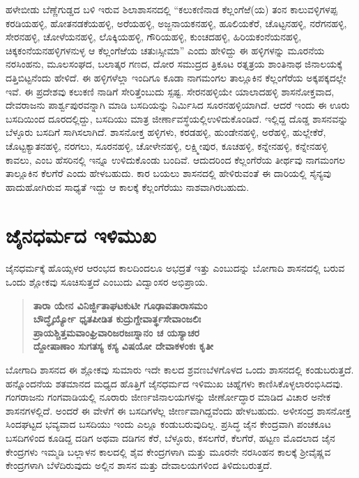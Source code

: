 ಹಳೇಬೀಡು ಬೆಣ್ಣೆಗುಡ್ಡದ ಬಳಿ ಇರುವ ಶಿಲಾಶಾಸನದಲ್ಲಿ “ಕಲುಕಣಿನಾಡ ಕೆಲ್ಲಂಗೆಱೆ(ಯ) ತಂನ ಕಾಲುವಳ್ಳಿ\-ಗಳಪ್ಪ ಕರಡಿಯಹಳ್ಳಿ, ಹೋತನಡಕೆಯಹಳ್ಳಿ, ಅರೆಯಹಳ್ಳಿ, ಅಜ್ಜನಾಯಕನಹಳ್ಳಿ, ಹೂಲಿಯಕೆರೆ, ಚೊಟ್ಟನಹಳ್ಳಿ, ನರೆಗನಹಳ್ಳಿ, ಸೇರನಹಳ್ಳಿ, ಚೋಳೆಯನಹಳ್ಳಿ, ಲೊಕ್ಕಿಯಹಳ್ಳಿ, ಗೌರಿಯಹಳ್ಳಿ, ಕುಂಚದಹಳ್ಳಿ, ಹಿರಿಯಕಂನೆಯನಹಳ್ಳಿ, ಚಿಕ್ಕಕಂನೆಯನಹಳ್ಳಿಗಳನುಳ್ಳ ಆ ಕೆಲ್ಲಂಗೆಱೆಯ ಚತುಃಸ್ಸೀಮಾ” ಎಂದು ಹೇಳಿದ್ದು ಈ ಹಳ್ಳಿಗಳನ್ನು ಮೂರನೆಯ ನರಸಿಂಹನು, ಮೂಲಸಂಘದ, ಬಲಾತ್ಕರ ಗಣದ, ದೋರ ಸಮುದ್ರದ ತ್ರಿಕೂಟ ರತ್ನತ್ರಯ ಶಾಂತಿನಾಥ ಜಿನಾಲಯಕ್ಕೆ ದತ್ತಿಬಿಟ್ಟನೆಂದು ಹೇಳಿದೆ. ಈ ಹಳ್ಳಿಗಳೆಲ್ಲಾ ಇಂದಿಗೂ ಕೂಡಾ ನಾಗಮಂಗಲ ತಾಲ್ಲೂಕಿನ ಕೆಲ್ಲಂಗೆರೆಯ ಅಕ್ಕಪಕ್ಕದಲ್ಲೇ ಇವೆ. ಈ ಪ್ರದೇಶವು ಕಲುಕಣಿ ನಾಡಿಗೆ ಸೇರಿತ್ತೆಂಬುದು ಸ್ಪಷ್ಟ. ಸೇರನಹಳ್ಳಿಯೇ ಯಾಲಾದಹಳ್ಳಿ ಶಾಸನೋಕ್ತವಾದ, ದೇವರಾಜನು ಪಾರ್ಶ್ವಪುರವನ್ನಾಗಿ ಮಾಡಿ ಬಸದಿಯನ್ನು ನಿರ್ಮಿಸಿದ ಸೂರನಹಳ್ಳಿಯಾಗಿದೆ. ಆದರೆ ಇಂದು ಈ ಊರು ಬಸದಿಯಿಂದ ದೂರದಲ್ಲಿದ್ದು, ಬಸದಿಯು ಮಾತ್ರ ಜೀರ್ಣಾವಸ್ಥೆಯಲ್ಲಿ\break ಉಳಿದುಕೊಂಡಿದೆ. ಇಲ್ಲಿದ್ದ ದೊಡ್ಡ ಶಾಸನವನ್ನು ಬೆಳ್ಳೂರು ಬಸದಿಗೆ ಸಾಗಿಸಲಾಗಿದೆ. ಶಾಸನೋಕ್ತ ಹಳ್ಳಿಗಳು, ಕರಡಹಳ್ಳಿ, \hbox{ಹುಂಡೇನಹಳ್ಳಿ}, ಅರೆಹಳ್ಳಿ, ಹುಲ್ಲೇಕೆರೆ, ಚೊಟ್ಟಕ್ಯಾತನಹಳ್ಳಿ, ನರಗಲು, ಸೂರನಹಳ್ಳಿ, ಚೋಳೇನಹಳ್ಳಿ, ಲಕ್ಷ್ಮೀಪುರ, ಕೂಚಹಳ್ಳಿ, ಕನ್ನೇನಹಳ್ಳಿ, ಕನ್ನೇನಹಳ್ಳಿ ಕಾವಲು, ಎಂಬ ಹೆಸರಿನಲ್ಲಿ ಇನ್ನೂ ಉಳಿದುಕೊಂಡು ಬಂದಿವೆ. ಆದುದರಿಂದ ಕೆಲ್ಲಂಗೆರೆಯ ತೀರ್ಥವು ನಾಗಮಂಗಲ ತಾಲ್ಲೂಕಿನ ಕೆಲಗೆರೆ ಎಂದು ಹೇಳಬಹುದು. ಕಾರ ಬಯಲು ಶಾಸನದಲ್ಲಿ ಹೇಳಿರುವಂತೆ ಈ ದಾರಿಯಲ್ಲಿ ಸೈನ್ಯವು ಹಾದುಹೋಗಿರುವ ಸಾಧ್ಯತೆ ಇದ್ದು ಆ ಕಾಲಕ್ಕೆ ಕೆಲ್ಲಂಗೆರೆಯು ನಾಶವಾಗಿರಬಹುದು.

\section*{ಜೈನಧರ್ಮದ ಇಳಿಮುಖ}

ಜೈನಧರ್ಮಕ್ಕೆ ಹೊಯ್ಸಳರ ಆರಂಭದ ಕಾಲದಿಂದಲೂ ಅಭದ್ರತೆ ಇತ್ತು ಎಂಬುದನ್ನು ಬೋಗಾದಿ ಶಾಸನದಲ್ಲಿ ಬರುವ ಒಂದು ಶ್ಲೋಕವು ಸೂಚಿಸುತ್ತದೆ ಎಂಬುದು ವಿದ್ವಾಂಸರ ಅಭಿಪ್ರಾಯ.

\begin{verse}
\textbf{ತಾರಾ ಯೇನ ವಿನಿರ್ಜ್ಜಿತಾಘಟಕುಟೀ ಗೂಢಾವತಾರಾಸಮಂ} \\\textbf{ಬೌದ್ಧೈರ್ಯ್ಯೋ ಧೃತಪೀಡಿತ ಕುದ್ರುಗ್ದೇವಾರ್ತ್ಥಸೇವಾಂಜಲಿಃ} \\\textbf{ಪ್ರಾಯಶ್ಚಿತ್ತಮವಾಂಘ್ರಿವಾರಿಜರಜಃಸ್ನಾನಂ ಚ ಯಸ್ಯಾಚರ} \\\textbf{ದ್ದೋಷಾಣಾಂ ಸುಗತಸ್ಯ ಕಸ್ಯ ವಿಷಯೋ ದೇವಾಕಳಂಕಃ ಕೃತೀ}
\end{verse}

ಬೋಗಾದಿ ಶಾಸನದ ಈ ಶ್ಲೋಕವು ಸುಮಾರು ಇದೇ ಕಾಲದ ಶ್ರವಣಬೆಳಗೊಳದ ಒಂದು ಶಾಸನದಲ್ಲಿ ಕಂಡು\-ಬರುತ್ತದೆ. ಹನ್ನೊಂದನೆಯ ಶತಮಾನದ ಮಧ್ಯದ ಹೊತ್ತಿಗೆ ಜೈನಧರ್ಮದ ಇಳಿಮುಖ ಚಿಹ್ನೆಗಳು ಕಾಣಿಸಿಕೊಳ್ಳಲಾರಂಭಿ\-ಸಿದವು. ಗಂಗರಾಜನು ಗಂಗವಾಡಿಯಲ್ಲಿ ನೂರಾರು ಜೀರ್ಣಜಿನಾಲಯಗಳನ್ನು ಜೀರ್ಣೋದ್ಧಾರ ಮಾಡಿದ ವಿಚಾರ ಅನೇಕ ಶಾಸನಗಳಲ್ಲಿದೆ. ಅಂದರೆ ಈ ವೇಳೆಗೆ ಈ ಬಸದಿಗಳೆಲ್ಲ ಜೀರ್ಣವಾಗಿದ್ದವೆಂದು ಹೇಳಬಹುದು. ಅಳೀಸಂದ್ರ ಶಾಸನೋಕ್ತ ಸಿಂದಘಟ್ಟದ ಭವ್ಯವಾದ ಬಸದಿಯು ಇಂದು ಎಲ್ಲೂ ಕಂಡುಬರುವುದಿಲ್ಲ. ಪ್ರಸಿದ್ಧ ಜೈನ ಕೇಂದ್ರವಾಗಿ ಪಂಚಕೂಟ ಬಸದಿ\-ಗಳಿಂದ ಕೂಡಿದ್ದ ದಡಿಗ ಅಥವಾ ದಡಿಗನ ಕೆರೆ, ಬೆಳ್ಳೂರು, ಕಸಲಗೆರೆ, ಕೆಲಗೆರೆ, ಹಟ್ಟಣ ಮೊದಲಾದ ಜೈನ ಕೇಂದ್ರಗಳು ಇಮ್ಮಡಿ ಬಲ್ಲಾಳನ ಕಾಲದಲ್ಲಿ ಶೈವ ಕೇಂದ್ರಗಳಾಗಿ ಮತ್ತು ಮೂರನೇ ನರಸಿಂಹನ ಕಾಲಕ್ಕೆ ಶ‍್ರೀವೈಷ್ಣವ ಕೇಂದ್ರಗಳಾಗಿ ಬೆಳೆದಿರುವುದು ಅಲ್ಲಿನ ಶಾಸನ ಮತ್ತು ದೇವಾಲಯಗಳಿಂದ ತಿಳಿದುಬರುತ್ತದೆ.

